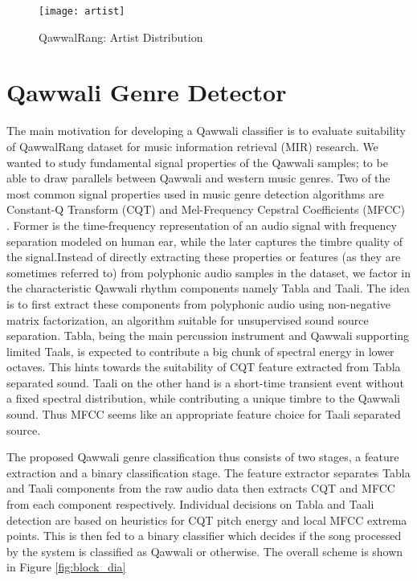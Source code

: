 \documentclass{article}
\begin{document}
\begin{figure}[htbp]
  \centering
  \texttt{[image: artist]}
  \caption{QawwalRang: Artist Distribution}
\label{fig:author_dist}
\end{figure}

\section{Qawwali Genre Detector}\label{sec:detector}

The main motivation for developing a Qawwali classifier is to evaluate suitability of QawwalRang dataset for music information retrieval (MIR) research. We wanted to study fundamental signal properties of the Qawwali samples; to be able to draw parallels between Qawwali and western music genres. Two of the most common signal properties used in music genre detection algorithms are Constant-Q Transform (CQT) and Mel-Frequency Cepstral Coefficients (MFCC) \citep{panagakis}. Former is the time-frequency representation of an audio signal with frequency separation modeled on human ear, while the later captures the timbre quality of the signal.Instead of directly extracting these properties or features (as they are sometimes referred to) from polyphonic audio samples in the dataset, we factor in the characteristic Qawwali rhythm components namely Tabla and Taali. The idea is to first extract these components from polyphonic audio using non-negative matrix factorization, an algorithm \citep{virtanen} suitable for unsupervised sound source separation. Tabla, being the main percussion instrument and Qawwali supporting limited Taals, is expected to contribute a big chunk of spectral energy in lower octaves. This hints towards the suitability of CQT feature extracted from Tabla separated sound. Taali on the other hand is a short-time transient event without a fixed spectral distribution, while contributing a unique timbre to the Qawwali sound. Thus MFCC seems like an appropriate feature choice for Taali separated source.

The proposed Qawwali genre classification thus consists of two stages, a feature extraction and a binary classification stage. The feature extractor separates Tabla and Taali components from the raw audio data then extracts CQT and MFCC from each component respectively. Individual decisions on Tabla and Taali detection are based on heuristics for CQT pitch energy and local MFCC extrema points. This is then fed to a binary classifier which decides if the song processed by the system is classified as Qawwali or otherwise. The overall scheme is shown in Figure \ref{fig:block_dia}
\end{document}
